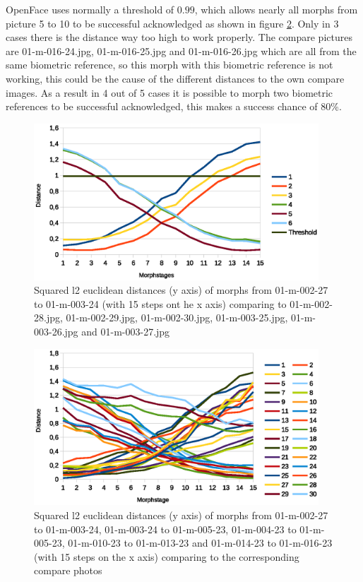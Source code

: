 OpenFace uses normally a threshold of \textbf{$0.99$}, which allows nearly all morphs from picture 5 to 10 to be successful acknowledged as shown in figure \ref{fig:Result1-5}. Only in 3 cases there is the distance way too high to work properly. The compare pictures are 01-m-016-24.jpg, 01-m-016-25.jpg and 01-m-016-26.jpg which are all from the same biometric reference, so this morph with this biometric reference is not working, this could be the cause of the different distances to the own compare images. As a result in 4 out of 5 cases it is possible to morph two biometric references to be successful acknowledged, this makes a success chance of $80$\%.

\begin{figure}[htbp] 
	\centering
		\includegraphics[width=0.95\textwidth]{Resources/result1ODF.eps}
	\caption{Squared l2 euclidean distances (y axis) of morphs from 01-m-002-27 to 01-m-003-24 (with 15 steps ont he x axis) comparing to 01-m-002-28.jpg, 01-m-002-29.jpg, 01-m-002-30.jpg, 01-m-003-25.jpg, 01-m-003-26.jpg and 01-m-003-27.jpg}
	\label{fig:Result1}
\end{figure}

\begin{figure}[htbp] 
	\centering
		\includegraphics[width=0.95\textwidth]{Resources/result1-5ODF.eps}
	\caption{Squared l2 euclidean distances (y axis) of morphs from 01-m-002-27 to 01-m-003-24, 01-m-003-24 to 01-m-005-23, 01-m-004-23 to 01-m-005-23, 01-m-010-23 to 01-m-013-23 and 01-m-014-23 to 01-m-016-23 (with 15 steps on the x axis) comparing to the corresponding compare photos}
	\label{fig:Result1-5}
\end{figure}

